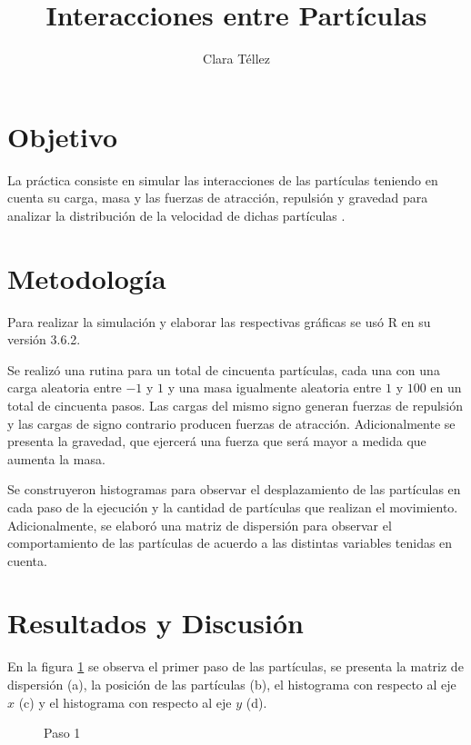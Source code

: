 \documentclass{article}
\begin{document}
\title{\textbf{Interacciones entre Part\'iculas}}
\author{Clara T\'ellez}
\maketitle

\section{Objetivo}\label{obj}

La pr\'actica consiste en simular las interacciones de las part\'iculas teniendo en cuenta su carga, masa y las fuerzas de atracci\'on, repulsi\'on y gravedad para analizar la distribuci\'on de la velocidad de dichas part\'iculas \cite{eli}.

\section{Metodolog\'ia}\label{met}

Para realizar la simulaci\'on y elaborar las respectivas gr\'aficas se us\'o R en su versi\'on 3.6.2.

Se realiz\'o una rutina para un total de cincuenta part\'iculas, cada una con una carga aleatoria entre $-1$ y $1$ y una masa igualmente aleatoria entre $1$ y $100$ en un total de cincuenta pasos.  Las cargas del mismo signo generan fuerzas de repulsi\'on y las cargas de signo contrario producen fuerzas de atracci\'on.  Adicionalmente se presenta la gravedad, que  ejercer\'a una fuerza que ser\'a mayor a medida que aumenta la masa.
  

Se construyeron histogramas para observar el desplazamiento de las part\'iculas en cada paso de la ejecuci\'on y la cantidad de part\'iculas que realizan el movimiento.  Adicionalmente, se elabor\'o una matriz de dispersi\'on para observar el comportamiento de las part\'iculas de acuerdo a las distintas variables tenidas en cuenta.


\section{Resultados y Discusi\'on}\label{res}

En la figura \ref{f1}  se observa el primer paso de las part\'iculas, se presenta la matriz de dispersi\'on (a), la posici\'on de las part\'iculas (b), el histograma con respecto al eje $x$ (c) y el histograma con respecto al eje $y$ (d).

\begin{figure}[htbp]
\centering
{}
\caption{Paso 1} \label{f1}
\end{figure}
\end{document}
